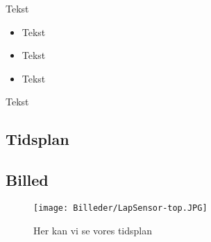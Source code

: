 Tekst

\begin{itemize}
	\item Tekst
	\item Tekst
	\item Tekst
\end{itemize}

Tekst


\subsection{Tidsplan}



\subsection{Billed}

\begin{figure}[h]
	\centering
		\texttt{[image: Billeder/LapSensor-top.JPG]}
	\caption{Her kan vi se vores tidsplan}
	\label{fig:Test}
\end{figure}